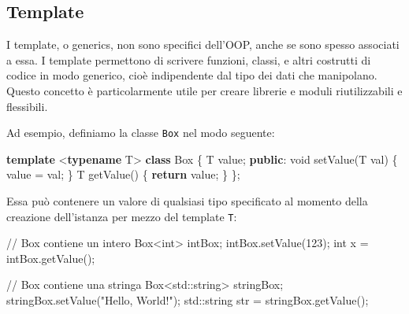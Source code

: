 \documentclass[
  letterpaper,
]{scrbook}
\newenvironment{Shaded}{\begin{snugshade}}{\end{snugshade}}
\newcommand{\BuiltInTok}[1]{\textcolor[rgb]{0.00,0.23,0.31}{#1}}
\newcommand{\CommentTok}[1]{\textcolor[rgb]{0.37,0.37,0.37}{#1}}
\newcommand{\ControlFlowTok}[1]{\textcolor[rgb]{0.00,0.23,0.31}{\textbf{#1}}}
\newcommand{\DataTypeTok}[1]{\textcolor[rgb]{0.68,0.00,0.00}{#1}}
\newcommand{\DecValTok}[1]{\textcolor[rgb]{0.68,0.00,0.00}{#1}}
\newcommand{\KeywordTok}[1]{\textcolor[rgb]{0.00,0.23,0.31}{\textbf{#1}}}
\newcommand{\NormalTok}[1]{\textcolor[rgb]{0.00,0.23,0.31}{#1}}
\newcommand{\OperatorTok}[1]{\textcolor[rgb]{0.37,0.37,0.37}{#1}}
\newcommand{\StringTok}[1]{\textcolor[rgb]{0.13,0.47,0.30}{#1}}
\begin{document}
\subsection{Template}\label{template}

I template, o generics, non sono specifici dell'OOP, anche se sono
spesso associati a essa. I template permettono di scrivere funzioni,
classi, e altri costrutti di codice in modo generico, cioè indipendente
dal tipo dei dati che manipolano. Questo concetto è particolarmente
utile per creare librerie e moduli riutilizzabili e flessibili.

Ad esempio, definiamo la classe \texttt{Box} nel modo seguente:

\begin{Shaded}
\begin{Highlighting}[]
\KeywordTok{template} \OperatorTok{\textless{}}\KeywordTok{typename}\NormalTok{ T}\OperatorTok{\textgreater{}}
\KeywordTok{class}\NormalTok{ Box }\OperatorTok{\{}
\NormalTok{    T value}\OperatorTok{;}
\KeywordTok{public}\OperatorTok{:}
    \DataTypeTok{void}\NormalTok{ setValue}\OperatorTok{(}\NormalTok{T val}\OperatorTok{)} \OperatorTok{\{}\NormalTok{ value }\OperatorTok{=}\NormalTok{ val}\OperatorTok{;} \OperatorTok{\}}
\NormalTok{    T getValue}\OperatorTok{()} \OperatorTok{\{} \ControlFlowTok{return}\NormalTok{ value}\OperatorTok{;} \OperatorTok{\}}
\OperatorTok{\};}
\end{Highlighting}
\end{Shaded}

Essa può contenere un valore di qualsiasi tipo specificato al momento
della creazione dell'istanza per mezzo del template \texttt{T}:

\begin{Shaded}
\begin{Highlighting}[]
\CommentTok{// Box contiene un intero}
\NormalTok{Box}\OperatorTok{\textless{}}\DataTypeTok{int}\OperatorTok{\textgreater{}}\NormalTok{ intBox}\OperatorTok{;}
\NormalTok{intBox}\OperatorTok{.}\NormalTok{setValue}\OperatorTok{(}\DecValTok{123}\OperatorTok{);}
\DataTypeTok{int}\NormalTok{ x }\OperatorTok{=}\NormalTok{ intBox}\OperatorTok{.}\NormalTok{getValue}\OperatorTok{();}

\CommentTok{// Box contiene una stringa}
\NormalTok{Box}\OperatorTok{\textless{}}\BuiltInTok{std::}\NormalTok{string}\OperatorTok{\textgreater{}}\NormalTok{ stringBox}\OperatorTok{;}
\NormalTok{stringBox}\OperatorTok{.}\NormalTok{setValue}\OperatorTok{(}\StringTok{"Hello, World!"}\OperatorTok{);}
\BuiltInTok{std::}\NormalTok{string str }\OperatorTok{=}\NormalTok{ stringBox}\OperatorTok{.}\NormalTok{getValue}\OperatorTok{();}
\end{Highlighting}
\end{Shaded}
\end{document}
